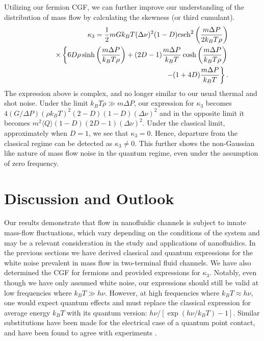 \documentclass[%
 reprint,
 aps,
 prb,
 epsf,
]{revtex4-2}
\begin{document}
    Utilizing our fermion CGF, we can further improve our understanding of the distribution of mass flow by calculating the skewness (or third cumulant).
    \begin{eqnarray}\nonumber
        &&\kappa_3 = \frac{1}{2}mGk_BT(\Delta \nu)^2 (1-D)\mathrm{csch}^2\left( \frac{m\Delta P}{2k_BT\rho}\right) \\ 
        &&\nonumber\times\left\{ 6D\rho \sinh{\left(\frac{m\Delta P}{k_BT\rho}\right)} +(2D-1)\frac{m\Delta P}{k_BT}\cosh{\left(\frac{m\Delta P}{k_BT\rho}\right)}\right. \\ 
        &&\hspace{0.5\columnwidth}\left. - (1+4D)\frac{m\Delta P}{k_BT}\right\}.
    \end{eqnarray}
    The expression above is complex, and no longer similar to our usual thermal and shot noise. Under the limit $k_BT\rho\gg m\Delta P$, our expression for $\kappa_3$ becomes $4(G/\Delta P)(\rho k_BT)^2 (2-D)(1-D)(\Delta\nu)^2$ and in the opposite limit it becomes $m^2\langle Q\rangle (1-D)(2D-1)(\Delta\nu)^2$. Under the classical limit, approximately when $D=1$, we see that $\kappa_3=0$. Hence, departure from the classical regime can be detected as $\kappa_3\neq0$. This further shows the non-Gaussian like nature of mass flow noise in the quantum regime, even under the assumption of zero frequency.
    
\section{\label{sec:discussion}Discussion and Outlook}
    Our results demonstrate that flow in nanofluidic channels is subject to innate mass-flow fluctuations, which vary depending on the conditions of the system and may be a relevant consideration in the study and applications of nanofluidics. In the previous sections we have derived classical and quantum expressions for the white noise prevalent in mass flow in two-terminal fluid channels. We have also determined the CGF for fermions and provided expressions for $\kappa_3$. Notably, even though we have only assumed white noise, our expressions should still be valid at low frequencies where $k_BT\gg h\nu$. However, at high frequencies where $k_BT\approx h\nu$, one would expect quantum effects and must replace the classical expression for average energy $k_BT$ with its quantum version: $h\nu /[\exp{(h\nu/k_BT)}-1]$. Similar substitutions have been made for the electrical case of a quantum point contact, and have been found to agree with experiments \cite{QPC}.\\
    
\end{document}
